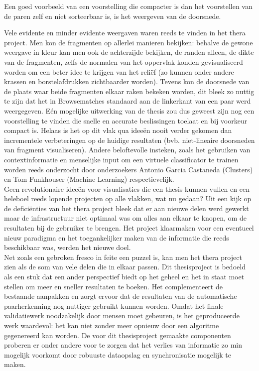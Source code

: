 Een goed voorbeeld van een voorstelling die compacter is dan het voorstellen van de paren zelf en niet sorteerbaar is, is het weergeven van de doorsnede. 

Vele evidente en minder evidente weergaven waren reeds te vinden in het thera project. Men kon de fragmenten op allerlei manieren bekijken: behalve de gewone weergave in kleur kan men ook de achterzijde bekijken, de randen alleen, de dikte van de fragmenten, zelfs de normalen van het oppervlak konden gevisualiseerd worden om een beter idee te krijgen van het reli\"ef (zo kunnen onder andere krassen en borstelafdrukken zichtbaarder worden). Tevens kon de doorsnede van de plaats waar beide fragmenten elkaar raken bekeken worden, dit bleek zo nuttig te zijn dat het in Browsematches standaard aan de linkerkant van een paar werd weergegeven. E\'en mogelijke uitwerking van de thesis zou dus geweest zijn nog een voorstelling te vinden die snelle en accurate beslissingen toelaat en bij voorkeur compact is. Helaas is het op dit vlak qua idee\"en nooit verder gekomen dan incrementele verbeteringen op de huidige resultaten (bvb. niet-lineaire doorsneden van fragment visualiseren). Andere beloftevolle insteken, zoals het gebruiken van contextinformatie en menselijke input om een virtuele classificator te trainen worden reeds onderzocht door onderzoekers Antonio Garcia Castaneda (Clusters) en Tom Funkhouser (Machine Learning) respectievelijk.\\

Geen revolutionaire idee\"en voor visualisaties die een thesis kunnen vullen en een heleboel reeds lopende projecten op alle vlakken, wat nu gedaan? Uit een kijk op de defici\"enties van het thera project bleek dat er aan nieuwe delen werd gewerkt maar de infrastructuur niet optimaal was om alles aan elkaar te knopen, om de resultaten bij de gebruiker te brengen. Het project klaarmaken voor een eventueel nieuw paradigma en het toegankelijker maken van de informatie die reeds beschikbaar was, werden het nieuwe doel.\\

Net zoals een gebroken fresco in feite een puzzel is, kan men het thera project zien als de som van vele delen die in elkaar passen. Dit thesisproject is bedoeld als een stuk dat een ander perspectief biedt op het geheel en het in staat moet stellen om meer en sneller resultaten te boeken. Het complementeert de bestaande aanpakken en zorgt ervoor dat de resultaten van de automatische paarherkenning nog nuttiger gebruikt kunnen worden. Omdat het finale validatiewerk noodzakelijk door mensen moet gebeuren, is het geproduceerde werk waardevol: het kan niet zonder meer opnieuw door een algoritme gegenereerd kan worden. De voor dit thesisproject gemaakte componenten proberen er onder andere voor te zorgen dat het verlies van informatie zo min mogelijk voorkomt door robuuste dataopslag en synchronisatie mogelijk te maken.\\

